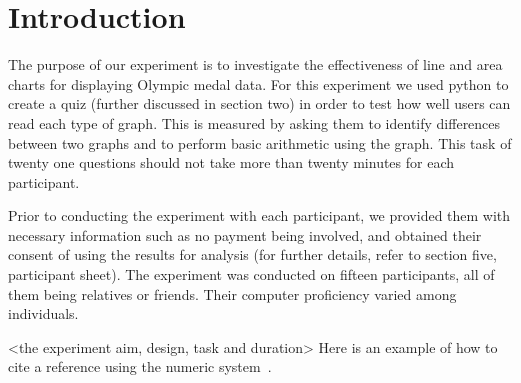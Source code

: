 \section{Introduction}

\begin{flushleft}
    \quad The purpose of our experiment is to investigate the effectiveness of line and area charts for displaying Olympic medal data.
    For this experiment we used python to create a quiz (further discussed in section two) in order to test how well users can read
    each type of graph. This is measured by asking them to identify differences between two graphs and to perform basic arithmetic
    using the graph. This task of twenty one questions should not take more than twenty minutes for each participant.
    
    \quad Prior to conducting the experiment with each participant, we provided them with necessary information such as no payment being involved, and obtained their consent of using the results for analysis (for further details, refer to section five, participant sheet). The experiment was conducted on fifteen participants, all of them being relatives or friends. Their computer proficiency varied among individuals. 
\end{flushleft}

<the experiment aim, design, task and duration> 
Here is an example of how to cite a reference using the numeric system~\cite{parikh1980adaptive}.

